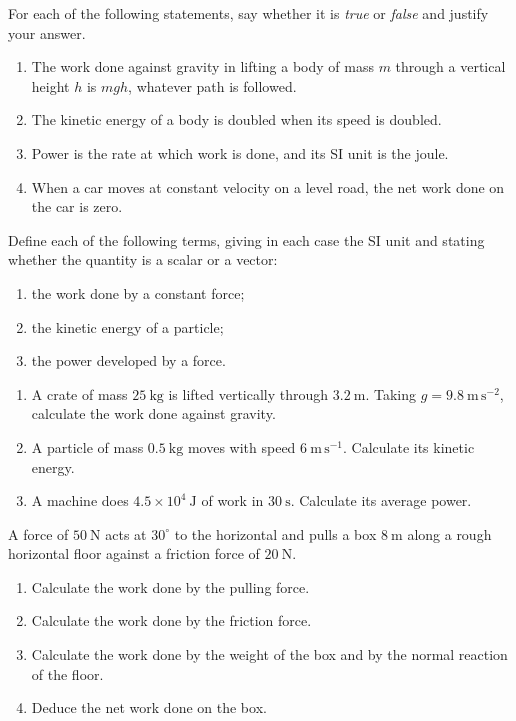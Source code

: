 \documentclass[11pt]{article}
\newcommand{\cle}[1]{{\popxbold\color{popdark}#1}}
\newcounter{popsec}
\newcounter{popsub}
\newcommand{\courssub}[1]{%
  \stepcounter{popsub}%
  \par\vspace{9pt}\noindent{\popxbold\fontsize{11.5}{13}\selectfont\color{popink}{\color{poporange}\thepopsec.\thepopsub}\hspace{6pt}#1}\par\nopagebreak\vspace{4pt}
}
\begin{document}
\begin{exercice}
For each of the following statements, say whether it is \emph{true} or \emph{false} and justify your answer.
\begin{enumerate}
\item The work done against gravity in lifting a body of mass $m$ through a vertical height $h$ is $mgh$, whatever path is followed.
\item The kinetic energy of a body is doubled when its speed is doubled.
\item Power is the rate at which work is done, and its SI unit is the joule.
\item When a car moves at constant velocity on a level road, the net work done on the car is zero.
\end{enumerate}
\end{exercice}

\begin{exercice}[Definitions]
Define each of the following terms, giving in each case the SI unit and stating whether the quantity is a scalar or a vector:
\begin{enumerate}
\item the \cle{work} done by a constant force;
\item the \cle{kinetic energy} of a particle;
\item the \cle{power} developed by a force.
\end{enumerate}
\end{exercice}

\begin{exercice}
\begin{enumerate}
\item A crate of mass $25\ \mathrm{kg}$ is lifted vertically through $3.2\ \mathrm{m}$. Taking $g = 9.8\ \mathrm{m\,s^{-2}}$, calculate the work done against gravity.
\item A particle of mass $0.5\ \mathrm{kg}$ moves with speed $6\ \mathrm{m\,s^{-1}}$. Calculate its kinetic energy.
\item A machine does $4.5\times 10^{4}\ \mathrm{J}$ of work in $30\ \mathrm{s}$. Calculate its average power.
\end{enumerate}
\end{exercice}

\courssub{I practise}

\begin{exercice}
A force of $50\ \mathrm{N}$ acts at $30^{\circ}$ to the horizontal and pulls a box $8\ \mathrm{m}$ along a rough horizontal floor against a friction force of $20\ \mathrm{N}$.
\begin{enumerate}
\item Calculate the work done by the pulling force.
\item Calculate the work done by the friction force.
\item Calculate the work done by the weight of the box and by the normal reaction of the floor.
\item Deduce the net work done on the box.
\end{enumerate}
\end{exercice}
\end{document}
